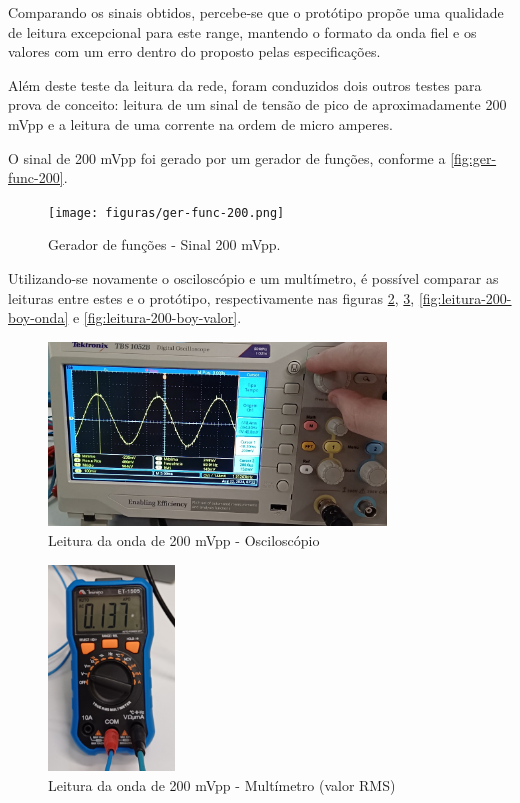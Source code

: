 Comparando os sinais obtidos, percebe-se que o protótipo propõe uma qualidade de leitura excepcional para este range, mantendo o formato da onda fiel e os valores com um erro dentro do proposto pelas especificações.

Além deste teste da leitura da rede, foram conduzidos dois outros testes para prova de conceito: leitura de um sinal de tensão de pico de aproximadamente 200 mVpp e a leitura de uma corrente na ordem de micro amperes.

O sinal de 200 mVpp foi gerado por um gerador de funções, conforme a \autoref{fig:ger-func-200}.

\begin{figure}[htb!]
    \caption{Gerador de funções - Sinal 200 mVpp.}
    \label{fig:ger-func-200}
    \texttt{[image: figuras/ger-func-200.png]}
    \fonte{}
\end{figure}

Utilizando-se novamente o osciloscópio e um multímetro, é possível comparar as leituras entre estes e o protótipo, respectivamente nas figuras \ref{fig:leitura-200-osc}, \ref{fig:leitura-200-mult}, \ref{fig:leitura-200-boy-onda} e \ref{fig:leitura-200-boy-valor}.

\begin{figure}[htb!]
    \caption{Leitura da onda de 200 mVpp - Osciloscópio}
    \label{fig:leitura-200-osc}
    \includegraphics[width=0.8\textwidth]{figuras/leitura-200-osc.png}
    \fonte{}
\end{figure}

\begin{figure}[htb!]
    \caption{Leitura da onda de 200 mVpp - Multímetro (valor RMS)}
    \label{fig:leitura-200-mult}
    \includegraphics[width=0.3\textwidth]{figuras/leitura-200-mult.png}
    \fonte{}
\end{figure}


